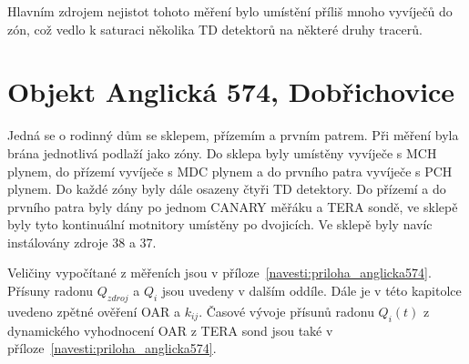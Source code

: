 Hlavním zdrojem nejistot tohoto měření bylo umístění příliš mnoho vyvíječů do zón, což vedlo k saturaci několika TD detektorů na některé druhy tracerů.

\section{Objekt Anglická 574, Dobřichovice}
Jedná se o rodinný dům se sklepem, přízemím a prvním patrem. Při měření byla brána jednotlivá podlaží jako zóny. Do sklepa byly umístěny vyvíječe s MCH plynem, do přízemí vyvíječe s MDC plynem a do prvního patra vyvíječe s PCH plynem. Do každé zóny byly dále osazeny čtyři TD detektory. Do přízemí a do prvního patra byly dány po jednom CANARY měřáku a TERA sondě, ve sklepě byly tyto kontinuální motnitory umístěny po dvojicích. Ve sklepě byly navíc instálovány zdroje 38 a 37.

Veličiny vypočítané z měřeních jsou v příloze~\ref{navesti:priloha_anglicka574}. Přísuny radonu $Q_{zdroj}$ a $Q_i$ jsou uvedeny v dalším oddíle. Dále je v této kapitolce uvedeno zpětné ověření OAR a $k_{ij}$. Časové vývoje přísunů radonu $Q_i(t)$ z dynamického vyhodnocení OAR z TERA sond jsou také v příloze~\ref{navesti:priloha_anglicka574}.


